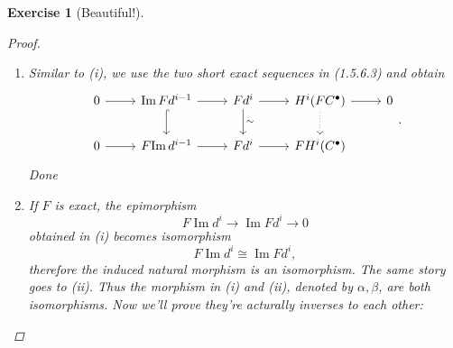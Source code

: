 \documentclass{article}
\theoremstyle{breakstyle}
\newtheorem{exercise}{Exercise}[section]
\DeclareMathOperator{\coker}{Coker}
\let\ker\relax
\DeclareMathOperator{\ker}{Ker}
\DeclareMathOperator{\im}{Im}
\begin{document}
\begin{exercise}[Beautiful!]
\begin{proof}
\begin{enumerate}[label=({\roman*})]
            Again from (1.5.6.4), we know
            $$
            0\longrightarrow H^{i}\left( C^{\bullet} \right) \longrightarrow
            \coker{d^{i-1}}\longrightarrow \im{d^{i}}\longrightarrow 0
            $$
            is exact. Apply it with F,
            $$
            \begin{tikzcd}
                        & F{H^{i}{(C^{\bullet})} } \arrow[r] \arrow[d, dotted] & F\left( \coker{d^{i-1}} \right) \arrow[r] \arrow[d, "\sim"] & F\left( \im{d^{i}} \right) \arrow[r] \arrow[d, two heads] & 0 \\
            0 \arrow[r] & H^{i}F{(C^{\bullet})} \arrow[r]                      & \coker{F{d^{i-1}}} \arrow[r]                                & \im{F{d^{i}}} \arrow[r]                                   & 0
            \end{tikzcd}
            $$
            we obtain the natural morphism by universal property.
        \item 
            Similar to \emph{(i)}, we use the two short exact sequences in
            (1.5.6.3) and obtain
            $$
            \begin{tikzcd}
            0 \arrow[r] & \im{F{d^{i-1}}} \arrow[r] \arrow[d, hook] & \ker{F{d^{i}}} \arrow[r] \arrow[d, "\sim"] & H^{i}{(F{C^{\bullet}})} \arrow[r] \arrow[d, dotted] & 0 \\
            0 \arrow[r] & F{\im{d^{i-1}}} \arrow[r]                 & F{\ker{d^{i}}} \arrow[r]                   & F{H^{i}{(C^{\bullet})}}                             &  
            \end{tikzcd}
            .$$
            Done
        \item 
            If $F$ is exact, the epimorphism
            $$
            F{\im{d^{i}}}\longrightarrow \im{F{d^{i}}}\longrightarrow 0
            $$
            obtained in \emph{(i)} becomes isomorphism
            $$
            F{\im{d^{i}}}\cong\im{F{d^{i}}}
            ,$$
            therefore the induced natural morphism is an isomorphism. The same
            story goes to \emph{(ii)}. Thus the morphism in \emph{(i)} and
            \emph{(ii)}, denoted by $\alpha,\beta$, are both isomorphisms. Now
            we'll prove they're acturally inverses to each other:


\end{enumerate}
\end{proof}
\end{exercise}
\end{document}
